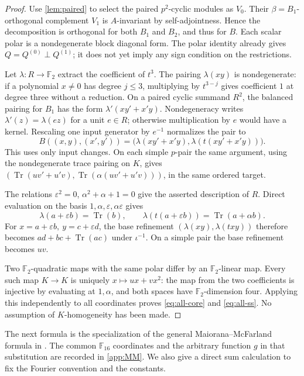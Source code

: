 \documentclass[11pt,a4paper]{article}
\theoremstyle{definition}
\theoremstyle{remark}
\numberwithin{equation}{section}
\newcommand{\F}{\mathbb F}
\newcommand{\Tr}{\operatorname{Tr}}
\newcommand{\eps}{\varepsilon}
\begin{document}
\begin{proof}
Use \cref{lem:paired} to select the paired \(p^2\)-cyclic modules
as \(V_0\). Their \(\beta=B_1\)-orthogonal complement \(V_1\) is
\(A\)-invariant by self-adjointness. Hence the decomposition is
orthogonal for both \(B_1\) and \(B_2\), and thus for \(B\).
Each scalar polar is a nondegenerate block diagonal form.
The polar identity already gives \(Q=Q^{(0)}\perp Q^{(1)}\);
it does not yet imply any sign condition on the restrictions.

Let \(\lambda:R\to\F_2\) extract the coefficient of \(t^3\).
The pairing \(\lambda(xy)\) is nondegenerate: if a polynomial
\(x\ne0\) has degree \(j\leq3\), multiplying by \(t^{3-j}\) gives
coefficient \(1\) at degree three without a reduction.
On a paired cyclic summand \(R^2\), the balanced pairing for \(B_1\)
has the form \(\lambda'(xy'+x'y)\).
Nondegeneracy writes \(\lambda'(z)=\lambda(ez)\) for a unit \(e\in R\);
otherwise multiplication by \(e\) would have a kernel.
Rescaling one input generator by \(e^{-1}\) normalizes the pair to
\begin{equation}\label{eq:R-polar}
 B((x,y),(x',y'))=
 \bigl(\lambda(xy'+x'y),\lambda(t(xy'+x'y))\bigr).
\end{equation}
This uses only input changes. On each simple \(p\)-pair the same
argument, using the nondegenerate trace pairing on \(K\), gives
\((\Tr(uv'+u'v),\Tr(\alpha(uv'+u'v)))\), in the same ordered target.

The relations \(\eps^2=0\), \(\alpha^2+\alpha+1=0\) give the asserted
description of \(R\). Direct evaluation on the basis
\(1,\alpha,\eps,\alpha\eps\) gives
\[
 \lambda(a+\eps b)=\Tr(b),\qquad
 \lambda(t(a+\eps b))=\Tr(a+\alpha b).
\]
For \(x=a+\eps b,\ y=c+\eps d\), the base refinement
\((\lambda(xy),\lambda(txy))\) therefore becomes
\(ad+bc+\Tr(ac)\) under \(\iota^{-1}\).
On a simple pair the base refinement becomes \(uv\).

Two \(\F_2\)-quadratic maps with the same polar differ by an
\(\F_2\)-linear map. Every such map \(K\to K\) is uniquely
\(x\mapsto ux+vx^2\): the map from the two coefficients is injective
by evaluating at \(1,\alpha\), and both spaces have \(\F_2\)-dimension
four. Applying this independently to all coordinates proves
\eqref{eq:all-core} and \eqref{eq:all-ss}.
No assumption of \(K\)-homogeneity has been made.
\end{proof}

The next formula is the specialization of the general
Maiorana--McFarland formula in \citep[equation (4), p.~313]{CMP18}.
The common \(\F_{16}\) coordinates and the arbitrary function \(g\)
in that substitution are recorded in \cref{app:MM}. We also give a
direct sum calculation to fix the Fourier convention and the constants.
\end{document}
